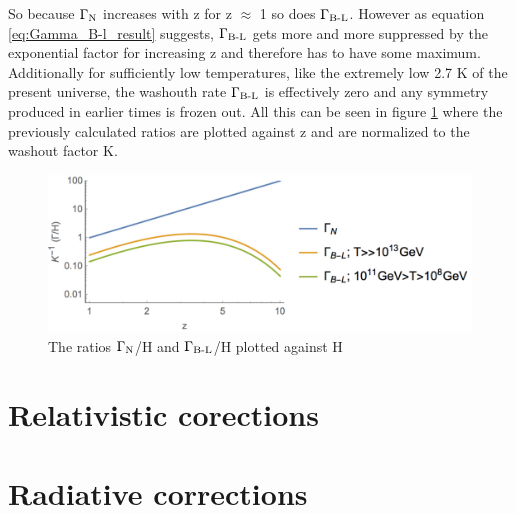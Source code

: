 So because $\Gamma\textsubscript{N}$ increases with z for z $\approx$ 1 so does $\Gamma\textsubscript{B-L}$. However as equation \ref{eq:Gamma_B-l_result} suggests, $\Gamma\textsubscript{B-L}$ gets more and more suppressed by the exponential factor for increasing z and therefore has to have some maximum. Additionally for sufficiently low temperatures, like the extremely low 2.7 K of the present universe, the washouth rate $\Gamma\textsubscript{B-L}$ is effectively zero and any symmetry produced in earlier times is frozen out. 
All this can be seen in figure \ref{fig:rates} where the previously calculated ratios are plotted against z and are normalized to the washout factor K.
\begin{figure}[H]
	\centering
	\includegraphics[width=0.8\linewidth]{Images/rates}
	\caption{The ratios $\Gamma\textsubscript{N}$/H and $\Gamma\textsubscript{B-L}$/H plotted against H}
	\label{fig:rates}
\end{figure}
\section{Relativistic corections}
\section{Radiative corrections}